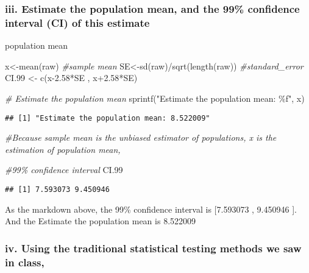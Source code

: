 \documentclass[
]{article}
\newenvironment{Shaded}{\begin{snugshade}}{\end{snugshade}}
\newcommand{\CommentTok}[1]{\textcolor[rgb]{0.56,0.35,0.01}{\textit{#1}}}
\newcommand{\FloatTok}[1]{\textcolor[rgb]{0.00,0.00,0.81}{#1}}
\newcommand{\FunctionTok}[1]{\textcolor[rgb]{0.00,0.00,0.00}{#1}}
\newcommand{\NormalTok}[1]{#1}
\newcommand{\OtherTok}[1]{\textcolor[rgb]{0.56,0.35,0.01}{#1}}
\newcommand{\SpecialCharTok}[1]{\textcolor[rgb]{0.00,0.00,0.00}{#1}}
\newcommand{\StringTok}[1]{\textcolor[rgb]{0.31,0.60,0.02}{#1}}
\begin{document}
\hypertarget{iii.-estimate-the-population-mean-and-the-99-confidence-interval-ci-of-this-estimate}{%
\subsubsection{iii. Estimate the population mean, and the 99\%
confidence interval (CI) of this
estimate}\label{iii.-estimate-the-population-mean-and-the-99-confidence-interval-ci-of-this-estimate}}

population mean

\begin{Shaded}
\begin{Highlighting}[]
\NormalTok{x}\OtherTok{\textless{}{-}}\FunctionTok{mean}\NormalTok{(raw) }\CommentTok{\#sample mean}
\NormalTok{SE}\OtherTok{\textless{}{-}}\FunctionTok{sd}\NormalTok{(raw)}\SpecialCharTok{/}\FunctionTok{sqrt}\NormalTok{(}\FunctionTok{length}\NormalTok{(raw)) }\CommentTok{\#standard\_error}
\NormalTok{CI}\FloatTok{.99} \OtherTok{\textless{}{-}} \FunctionTok{c}\NormalTok{(x}\FloatTok{{-}2.58}\SpecialCharTok{*}\NormalTok{SE , x}\FloatTok{+2.58}\SpecialCharTok{*}\NormalTok{SE)}

\CommentTok{\# Estimate the population mean}
\FunctionTok{sprintf}\NormalTok{(}\StringTok{"Estimate the population mean: \%f"}\NormalTok{, x)}
\end{Highlighting}
\end{Shaded}

\begin{verbatim}
## [1] "Estimate the population mean: 8.522009"
\end{verbatim}

\begin{Shaded}
\begin{Highlighting}[]
\CommentTok{\#Because sample mean is the unbiased estimator of population\textquotesingle{}s, x is the estimation of population mean,}

\CommentTok{\#99\% confidence interval}
\NormalTok{CI}\FloatTok{.99} 
\end{Highlighting}
\end{Shaded}

\begin{verbatim}
## [1] 7.593073 9.450946
\end{verbatim}

As the markdown above, the 99\% confidence interval is {[}7.593073 ,
9.450946 {]}. And the Estimate the population mean is 8.522009

\hypertarget{iv.-using-the-traditional-statistical-testing-methods-we-saw-in-class}{%
\subsubsection{iv. Using the traditional statistical testing methods we
saw in
class,}\label{iv.-using-the-traditional-statistical-testing-methods-we-saw-in-class}}
\end{document}
